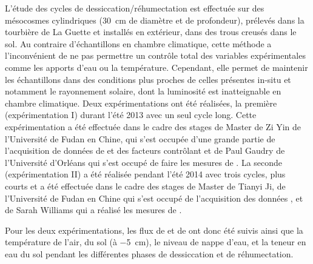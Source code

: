 L'étude des cycles de dessiccation/réhumectation est effectuée sur des mésocosmes cylindriques (\SI{30}{\centi\metre} de diamètre et de profondeur), prélevés dans la tourbière de La Guette et installés en extérieur, dans des trous creusés dans le sol.
Au contraire d'échantillons en chambre climatique, cette méthode a l'inconvénient de ne pas permettre un contrôle total des variables expérimentales comme les apports d'eau ou la température.
Cependant, elle permet de maintenir les échantillons dans des conditions plus proches de celles présentes in-situ et notamment le rayonnement solaire, dont la luminosité est inatteignable en chambre climatique.
Deux expérimentations ont été réalisées, la première (expérimentation I) durant l'été 2013 avec un seul cycle long.
Cette expérimentation a été effectuée dans le cadre des stages de Master de Zi Yin de l'Université de Fudan en Chine, qui s'est occupée d'une grande partie de l'acquisition de données de \coo et des facteurs contrôlant et de Paul Gaudry de l'Université d'Orléans qui s'est occupé de faire les mesures de \chh.
La seconde (expérimentation II) a été réalisée pendant l'été 2014 avec trois cycles, plus courts et a été effectuée dans le cadre des stages de Master de Tianyi Ji, de l'Université de Fudan en Chine qui s'est occupé de l'acquisition des données \coo, et de Sarah Williams qui a réalisé les mesures de \chh. 

Pour les deux expérimentations, les flux de \coo et de \chh ont donc été suivis ainsi que la température de l'air, du sol (à \SI{-5}{\centi\metre}), le niveau de nappe d'eau, et la teneur en eau du sol pendant les différentes phases de dessiccation et de réhumectation. 

